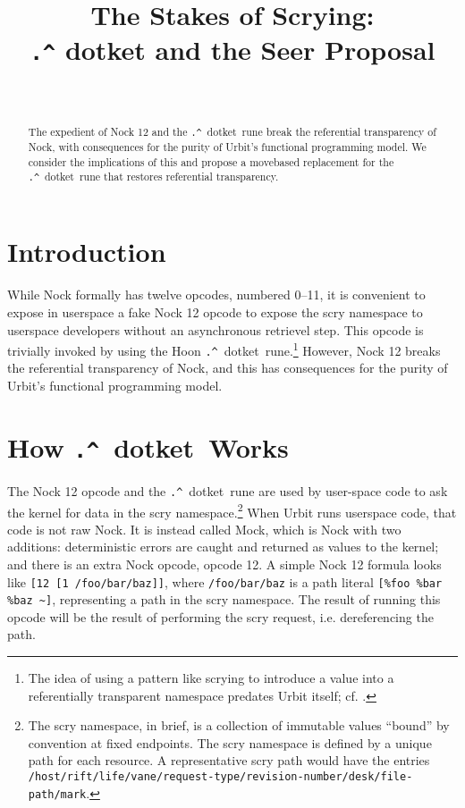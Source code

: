 \documentclass[twoside]{article}
\title{The Stakes of Scrying:  \\ \lstinline[style=inlinecode]{.^} dotket and the Seer Proposal}
\author{\authorname~\authorpatp \\ \affiliation}
\date{}
\newcommand{\dotket}{\lstinline[style=inlinecode]{.^}~dotket}
\begin{document}
\maketitle
\thispagestyle{firststyle}

\begin{abstract}
\noindent
The expedient of Nock 12 and the \dotket~rune break the referential transparency of Nock, with consequences for the purity of Urbit's functional programming model.  We consider the implications of this and propose a move\-based replacement for the \dotket~rune that restores referential transparency.
\end{abstract}

\setcounter{page}{47}

\tableofcontents

\section{Introduction}

While Nock formally has twelve opcodes, numbered 0--11, it is convenient to expose in userspace a fake Nock 12 opcode to expose the scry namespace to userspace developers without an asynchronous retrievel step.  This opcode is trivially invoked by using the Hoon \dotket~rune.\footnote{The idea of using a pattern like scrying to introduce a value into a referentially transparent namespace predates Urbit itself; cf. \citet{Yarvin2006}.}  However, Nock 12 breaks the referential transparency of Nock, and this has consequences for the purity of Urbit's functional programming model.

\section{How \dotket~Works}

The Nock 12 opcode and the \dotket~rune are used by user-\newline{}space code to ask the kernel for data in the scry namespace.\footnote{The scry namespace, in brief, is a collection of immutable values “bound” by convention at fixed endpoints.  The scry namespace is defined by a unique path for each resource.  A representative scry path would have the entries \texttt{/host/rift/life/vane/request-type/revision-number/desk\newline{}/file-path/mark}.}  When Urbit runs userspace code, that code is not raw Nock.  It is instead called Mock, which is Nock with two additions:   deterministic errors are caught and returned as values to the kernel; and there is an extra Nock opcode, opcode 12.  A simple Nock 12 formula looks like \lstinline[style=inlinecode]{[12 [1 /foo/bar/baz]]}, where \lstinline[style=inlinecode]{/foo/bar/baz} is a path literal \lstinline[style=inlinecode]{[%foo %bar %baz ~]}, representing a path in the scry namespace.  The result of running this opcode will be the result of performing the scry request, i.e. dereferencing the path.
\end{document}

